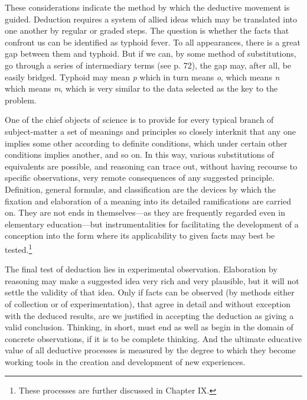 \documentclass[letterpaper]{book}
\begin{document}

These considerations indicate the method by which the deductive movement
is guided. Deduction requires a system of allied ideas which may be
translated into one another by regular or graded steps. The question is
whether the facts that confront us can be identified as typhoid fever.
To all appearances, there is a great gap between them and typhoid. But
if we can, by some method of substitutions, go through a series of
intermediary terms (see p. 72), the gap may, after all, be easily
bridged. Typhoid may mean \emph{p} which in turn means \emph{o}, which
means \emph{n} which means \emph{m}, which is very similar to the data
selected as the key to the problem.


One of the chief objects of science is to provide for every typical
branch of subject-matter a set of meanings and principles so closely
interknit that any one implies some other according to definite
conditions, which under certain other conditions implies another, and so
on. In this way, various substitutions of equivalents are possible, and
reasoning can trace out, without having recourse to specific
observations, very remote consequences of any suggested principle.
Definition, general formulæ, and classification are the devices by which
the fixation and elaboration of a meaning into its detailed
ramifications are carried on. They are not ends in themselves---as they
are frequently regarded even in elementary education---but
instrumentalities for
facilitating
the development of a conception into the form where its applicability to
given facts may best be
tested.\footnote{These processes are further discussed in Chapter IX.}


The final test of deduction lies in experimental observation.
Elaboration by reasoning may make a suggested idea very rich and very
plausible, but it will not settle the validity of that idea. Only if
facts can be observed (by methods either of collection or of
experimentation), that agree in detail and without exception with the
deduced results, are we justified in accepting the deduction as giving a
valid conclusion. Thinking, in short, must end as well as begin in the
domain of concrete observations, if it is to be complete thinking. And
the ultimate educative value of all deductive processes is measured by
the degree to which they become working tools in the creation and
development of new experiences.
\end{document}
